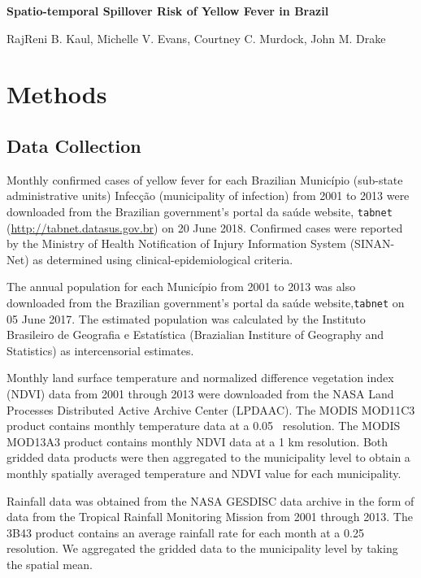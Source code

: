 \documentclass{article}
\begin{document}
\noindent
\textbf{\LARGE{Spatio-temporal Spillover Risk of Yellow Fever in Brazil}}

\bigskip
\noindent
RajReni B. Kaul, Michelle V. Evans, Courtney C. Murdock, John M. Drake
\smallskip

\tableofcontents

\newpage

\section{Methods}

\subsection{Data Collection}

Monthly confirmed cases of yellow fever for each Brazilian Munic\'{i}pio (sub-state administrative units) Infec\c{c}\~{a}o (municipality of infection) from 2001 to 2013 were downloaded from the Brazilian government's portal da sa\'{u}de website, \texttt{tabnet} (\url{http://tabnet.datasus.gov.br}) on 20 June 2018.
Confirmed cases were reported by the Ministry of Health Notification of Injury Information System (SINAN-Net) as determined using clinical-epidemiological criteria.

The annual population for each Munic\'{i}pio from 2001 to 2013 was also downloaded from the Brazilian government's portal da sa\'{u}de website,\texttt{tabnet} on 05 June 2017. The estimated population was calculated by the Instituto Brasileiro de Geografia e Estat\'{i}stica (Brazialian Institure of Geography and Statistics) as intercensorial estimates.

Monthly land surface temperature and normalized difference vegetation index (NDVI) data from 2001 through 2013 were downloaded from the NASA Land Processes Distributed Active Archive Center (LPDAAC). The MODIS MOD11C3 product contains monthly temperature data at a 0.05\degree~ resolution. The MODIS MOD13A3 product contains monthly NDVI data at a 1 km resolution. Both gridded data products were then aggregated to the municipality level to obtain a monthly spatially averaged temperature and NDVI value for each municipality.

Rainfall data was obtained from the NASA GESDISC data archive in the form of data from the Tropical Rainfall Monitoring Mission from 2001 through 2013. The 3B43 product contains an average rainfall rate for each month at a 0.25\degree~ resolution. We aggregated the gridded data to the municipality level by taking the spatial mean.
\end{document}
